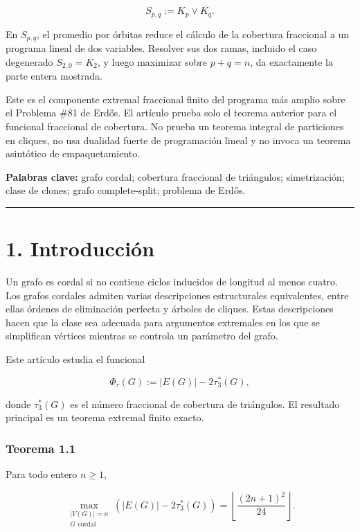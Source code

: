 \documentclass[
  11pt,
]{article}
\begin{document}
\[
S_{p,q}:=K_p\vee\overline{K_q}.
\]

En \(S_{p,q}\), el promedio por órbitas reduce el cálculo de la
cobertura fraccional a un programa lineal de dos variables. Resolver sus
dos ramas, incluido el caso degenerado \(S_{2,0}=K_2\), y luego
maximizar sobre \(p+q=n\), da exactamente la parte entera mostrada.

Este es el componente extremal fraccional finito del programa más amplio
sobre el Problema \#81 de Erdős. El artículo prueba solo el teorema
anterior para el funcional fraccional de cobertura. No prueba un teorema
integral de particiones en cliques, no usa dualidad fuerte de
programación lineal y no invoca un teorema asintótico de
empaquetamiento.

\textbf{Palabras clave:} grafo cordal; cobertura fraccional de
triángulos; simetrización; clase de clones; grafo complete-split;
problema de Erdős.

\begin{center}\rule{0.5\linewidth}{0.5pt}\end{center}

\section{1. Introducción}\label{introducciuxf3n}

Un grafo es cordal si no contiene ciclos inducidos de longitud al menos
cuatro. Los grafos cordales admiten varias descripciones estructurales
equivalentes, entre ellas órdenes de eliminación perfecta y árboles de
cliques. Estas descripciones hacen que la clase sea adecuada para
argumentos extremales en los que se simplifican vértices mientras se
controla un parámetro del grafo.

Este artículo estudia el funcional

\[
\Phi_\tau(G):=|E(G)|-2\tau_3^*(G),
\]

donde \(\tau_3^*(G)\) es el número fraccional de cobertura de
triángulos. El resultado principal es un teorema extremal finito exacto.

\subsubsection{Teorema 1.1}\label{teorema-1.1}

Para todo entero \(n\ge1\),

\[
\boxed{
\max_{\substack{|V(G)|=n\\G\text{ cordal}}}
\left(
|E(G)|-2\tau_3^*(G)
\right)
=
\left\lfloor\frac{(2n+1)^2}{24}\right\rfloor.
}
\]
\end{document}
